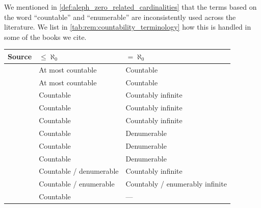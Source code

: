 \begin{remark}\label{rem:countability_terminology}
  We mentioned in \cref{def:aleph_zero_related_cardinalities} that the terms based on the word \enquote{countable} and \enquote{enumerable} are inconsistently used across the literature. We list in \cref{tab:rem:countability_terminology} how this is handled in some of the books we cite.

  \begin{table}
    \centering
    \begin{tabular}{l l l}
      \toprule
      Source                                                          & \( \leq \aleph_0 \)        & \( = \aleph_0 \)                \\
      \midrule
      \cite[30]{Jech2006SetTheory}                                    & At most countable          & Countable                       \\
      \cite[def. 2.3]{Rudin1976AnalysisPrinciples}                    & At most countable          & Countable                       \\
      \cite[def. I.10.5]{Kunen2013SetTheory}                          & Countable                  & Countably infinite              \\
      \cite[3]{Engelking1989GeneralTopology}                          & Countable                  & Countably infinite              \\
      \cite[25]{Kelley1975GeneralTopology}                            & Countable                  & Countably infinite              \\
      \cite[def. 6.2.32]{Hinman2005Logic}                             & Countable                  & Denumerable                     \\
      \cite[xxii]{Mendelson2015Logic}                                 & Countable                  & Denumerable                     \\
      \cite[3]{Harzheim2005OrderedSets}                               & Countable                  & Denumerable                     \\
      \cite[91]{Halmos1960NaiveSetTheory}                             & Countable / denumerable    & Countably infinite              \\
      \cite[176]{Kleene2002Logic}                                     & Countable / enumerable     & Countably / enumerably infinite \\
      \cite[159]{Enderton1977SetTheory}                               & Countable                  & ---                             \\

\end{tabular}
\end{table}
\end{remark}
